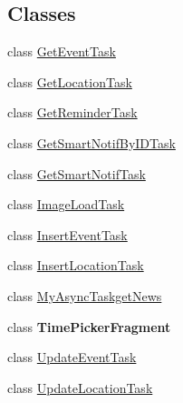 \subsection*{Classes}
\begin{DoxyCompactItemize}
\item 
class \hyperlink{classcom_1_1agenda_1_1ter_1_1smartgenda_1_1_event_activity_1_1_get_event_task}{Get\-Event\-Task}
\item 
class \hyperlink{classcom_1_1agenda_1_1ter_1_1smartgenda_1_1_event_activity_1_1_get_location_task}{Get\-Location\-Task}
\item 
class \hyperlink{classcom_1_1agenda_1_1ter_1_1smartgenda_1_1_event_activity_1_1_get_reminder_task}{Get\-Reminder\-Task}
\item 
class \hyperlink{classcom_1_1agenda_1_1ter_1_1smartgenda_1_1_event_activity_1_1_get_smart_notif_by_i_d_task}{Get\-Smart\-Notif\-By\-I\-D\-Task}
\item 
class \hyperlink{classcom_1_1agenda_1_1ter_1_1smartgenda_1_1_event_activity_1_1_get_smart_notif_task}{Get\-Smart\-Notif\-Task}
\item 
class \hyperlink{classcom_1_1agenda_1_1ter_1_1smartgenda_1_1_event_activity_1_1_image_load_task}{Image\-Load\-Task}
\item 
class \hyperlink{classcom_1_1agenda_1_1ter_1_1smartgenda_1_1_event_activity_1_1_insert_event_task}{Insert\-Event\-Task}
\item 
class \hyperlink{classcom_1_1agenda_1_1ter_1_1smartgenda_1_1_event_activity_1_1_insert_location_task}{Insert\-Location\-Task}
\item 
class \hyperlink{classcom_1_1agenda_1_1ter_1_1smartgenda_1_1_event_activity_1_1_my_async_taskget_news}{My\-Async\-Taskget\-News}
\item 
class {\bfseries Time\-Picker\-Fragment}
\item 
class \hyperlink{classcom_1_1agenda_1_1ter_1_1smartgenda_1_1_event_activity_1_1_update_event_task}{Update\-Event\-Task}
\item 
class \hyperlink{classcom_1_1agenda_1_1ter_1_1smartgenda_1_1_event_activity_1_1_update_location_task}{Update\-Location\-Task}
\end{DoxyCompactItemize}
